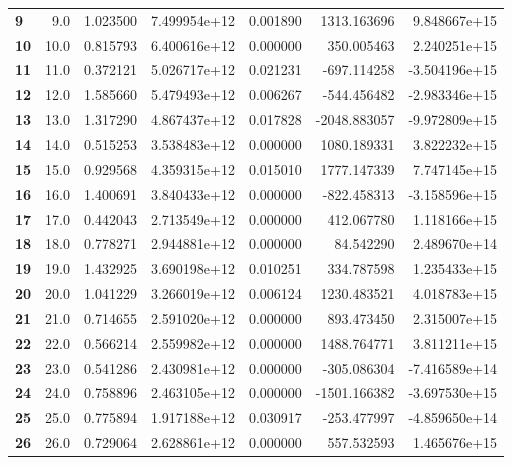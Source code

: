 \documentclass{report}[12pt]
\begin{document}
\begin{center}
\begin{tabular}{lrrrrrr}
\textbf{9   } &            9.0 &   1.023500 &  7.499954e+12 &    0.001890 &  1313.163696 &  9.848667e+15 \\
\textbf{10  } &           10.0 &   0.815793 &  6.400616e+12 &    0.000000 &   350.005463 &  2.240251e+15 \\
\textbf{11  } &           11.0 &   0.372121 &  5.026717e+12 &    0.021231 &  -697.114258 & -3.504196e+15 \\
\textbf{12  } &           12.0 &   1.585660 &  5.479493e+12 &    0.006267 &  -544.456482 & -2.983346e+15 \\
\textbf{13  } &           13.0 &   1.317290 &  4.867437e+12 &    0.017828 & -2048.883057 & -9.972809e+15 \\
\textbf{14  } &           14.0 &   0.515253 &  3.538483e+12 &    0.000000 &  1080.189331 &  3.822232e+15 \\
\textbf{15  } &           15.0 &   0.929568 &  4.359315e+12 &    0.015010 &  1777.147339 &  7.747145e+15 \\
\textbf{16  } &           16.0 &   1.400691 &  3.840433e+12 &    0.000000 &  -822.458313 & -3.158596e+15 \\
\textbf{17  } &           17.0 &   0.442043 &  2.713549e+12 &    0.000000 &   412.067780 &  1.118166e+15 \\
\textbf{18  } &           18.0 &   0.778271 &  2.944881e+12 &    0.000000 &    84.542290 &  2.489670e+14 \\
\textbf{19  } &           19.0 &   1.432925 &  3.690198e+12 &    0.010251 &   334.787598 &  1.235433e+15 \\
\textbf{20  } &           20.0 &   1.041229 &  3.266019e+12 &    0.006124 &  1230.483521 &  4.018783e+15 \\
\textbf{21  } &           21.0 &   0.714655 &  2.591020e+12 &    0.000000 &   893.473450 &  2.315007e+15 \\
\textbf{22  } &           22.0 &   0.566214 &  2.559982e+12 &    0.000000 &  1488.764771 &  3.811211e+15 \\
\textbf{23  } &           23.0 &   0.541286 &  2.430981e+12 &    0.000000 &  -305.086304 & -7.416589e+14 \\
\textbf{24  } &           24.0 &   0.758896 &  2.463105e+12 &    0.000000 & -1501.166382 & -3.697530e+15 \\
\textbf{25  } &           25.0 &   0.775894 &  1.917188e+12 &    0.030917 &  -253.477997 & -4.859650e+14 \\
\textbf{26  } &           26.0 &   0.729064 &  2.628861e+12 &    0.000000 &   557.532593 &  1.465676e+15 \\

\end{tabular}
\end{center}
\end{document}

